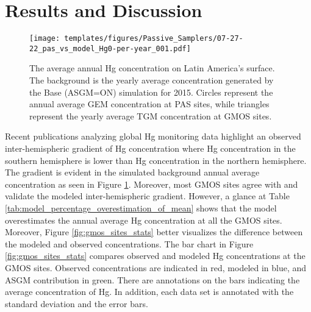 \section{Results and Discussion}\label{c2_results}
\begin{figure}[H]
\centering
  \texttt{[image: templates/figures/Passive\_Samplers/07-27-22\_pas\_vs\_model\_Hg0-per-year\_001.pdf]}
  \caption[The average annual Hg concentration on Latin America's surface. ]{The average annual Hg concentration on Latin America's surface. The background is the yearly average \hg concentration generated by the Base (ASGM=ON) simulation for 2015. Circles represent the annual average GEM concentration at PAS sites, while triangles represent the yearly average TGM concentration at GMOS sites\cite{sprovieri_atmospheric_2016,quant_measuring_2021,koenig_seasonal_2021}.}
  \label{fig:06-12-22_pas_vs_model_Hg0-per-year_001}
  
  
\end{figure}
\FloatBarrier
\begin{flushleft}
 Recent publications analyzing global Hg monitoring data highlight an observed inter-hemispheric gradient of Hg concentration where Hg concentration in the southern hemisphere is lower than Hg concentration in the northern hemisphere\cite{united_nations_environment_programme_technical_2019,sprovieri_atmospheric_2016}. The gradient is evident in the simulated background annual average \hg concentration as seen in Figure \ref{fig:06-12-22_pas_vs_model_Hg0-per-year_001}. Moreover, most GMOS sites agree with and validate the modeled inter-hemispheric gradient. However, a glance at Table \ref{tab:model_percentage_overestimation_of_mean} shows that the model overestimates the annual average Hg concentration at all the GMOS sites. Moreover, Figure \ref{fig:gmos_sites_stats} better visualizes the difference between the modeled and observed concentrations. The bar chart in Figure \ref{fig:gmos_sites_stats} compares observed and modeled Hg concentrations at the GMOS sites. Observed concentrations are indicated in red, modeled in blue, and ASGM contribution in green. There are annotations on the bars indicating the average concentration of Hg. In addition, each data set is annotated with the standard deviation and the error bars.
\end{flushleft}



